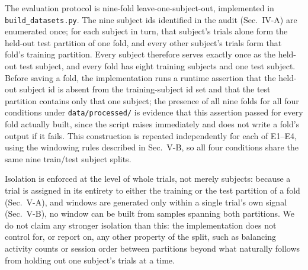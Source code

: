 \documentclass[conference]{IEEEtran}
\begin{document}
The evaluation protocol is nine-fold leave-one-subject-out,
implemented in \texttt{build\_datasets.py}. The nine subject ids
identified in the audit (Sec.~IV-A) are enumerated once; for each
subject in turn, that subject's trials alone form the held-out test
partition of one fold, and every other subject's trials form that
fold's training partition. Every subject therefore serves exactly
once as the held-out test subject, and every fold has eight training
subjects and one test subject. Before saving a fold, the
implementation runs a runtime assertion that the held-out subject id
is absent from the training-subject id set and that the test
partition contains only that one subject; the presence of all nine
folds for all four conditions under \texttt{data/processed/} is
evidence that this assertion passed for every fold actually built,
since the script raises immediately and does not write a fold's
output if it fails. This construction is repeated independently for
each of E1--E4, using the windowing rules described in Sec.~V-B, so
all four conditions share the same nine train/test subject splits.

Isolation is enforced at the level of whole trials, not merely
subjects: because a trial is assigned in its entirety to either the
training or the test partition of a fold (Sec.~V-A), and windows are
generated only within a single trial's own signal (Sec.~V-B), no
window can be built from samples spanning both partitions. We do not
claim any stronger isolation than this: the implementation does not
control for, or report on, any other property of the split, such as
balancing activity counts or session order between partitions beyond
what naturally follows from holding out one subject's trials at a
time.
\end{document}
